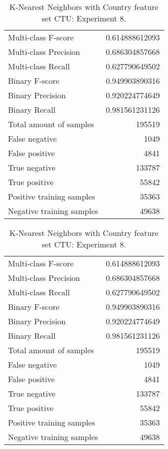 \begin{table}[H]
\begin{minipage}{0.5\textwidth}
\caption{K-Nearest Neighbors with Country feature set CTU: Experiment 7.}
\centering
\begin{tabular}{l r}
\toprule
Multi-class F-score & 0.614888612093 \\
Multi-class Precision & 0.686304857668 \\
Multi-class Recall & 0.627790649502 \\
\midrule
Binary F-score & 0.949903890316 \\
Binary Precision & 0.920224774649 \\
Binary Recall & 0.981561231126 \\
\midrule
Total amount of samples & 195519 \\
False negative & 1049 \\
False positive & 4841 \\
True negative & 133787 \\
True positive & 55842 \\
\midrule
Positive training samples & 35363 \\
Negative training samples & 49638 \\
\bottomrule
\end{tabular}
\end{minipage}
\hfillx
\begin{minipage}{0.5\textwidth}
\caption{K-Nearest Neighbors with Country feature set CTU: Experiment 8.}
\centering
\begin{tabular}{l r}
\toprule
Multi-class F-score & 0.614888612093 \\
Multi-class Precision & 0.686304857668 \\
Multi-class Recall & 0.627790649502 \\
\midrule
Binary F-score & 0.949903890316 \\
Binary Precision & 0.920224774649 \\
Binary Recall & 0.981561231126 \\
\midrule
Total amount of samples & 195519 \\
False negative & 1049 \\
False positive & 4841 \\
True negative & 133787 \\
True positive & 55842 \\
\midrule
Positive training samples & 35363 \\
Negative training samples & 49638 \\
\bottomrule
\end{tabular}
\end{minipage}
\end{table}
